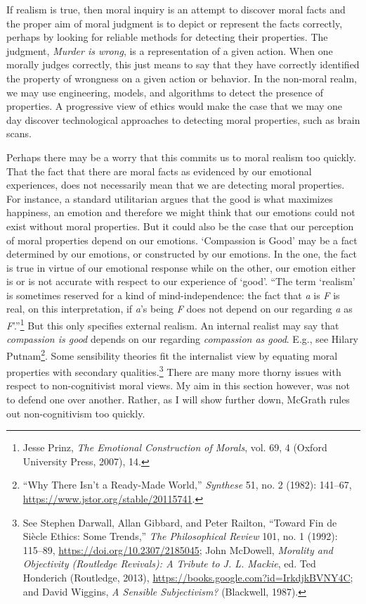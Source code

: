 \documentclass[phdthesis,12pt,final]{wuthesis}
\theoremstyle{definition}
\theoremstyle{definition}
\theoremstyle{definition}
\theoremstyle{definition}
\theoremstyle{remark}
\begin{document}
If realism is true, then moral inquiry is an attempt to discover moral facts and the proper aim of moral judgment is to depict or represent the facts correctly, perhaps by looking for reliable methods for detecting their properties. The judgment, \emph{Murder is wrong}, is a representation of a given action. When one morally judges correctly, this just means to say that they have correctly identified the property of wrongness on a given action or behavior. In the non-moral realm, we may use engineering, models, and algorithms to detect the presence of properties. A progressive view of ethics would make the case that we may one day discover technological approaches to detecting moral properties, such as brain scans.

Perhaps there may be a worry that this commits us to moral realism too quickly. That the fact that there are moral facts as evidenced by our emotional experiences, does not necessarily mean that we are detecting moral properties. For instance, a standard utilitarian argues that the good is what maximizes happiness, an emotion and therefore we might think that our emotions could not exist without moral properties. But it could also be the case that our perception of moral properties depend on our emotions. `Compassion is Good' may be a fact determined by our emotions, or constructed by our emotions. In the one, the fact is true in virtue of our emotional response while on the other, our emotion either is or is not accurate with respect to our experience of `good'. ``The term `realism' is sometimes reserved for a kind of mind-independence: the fact that \emph{a} is \emph{F} is real, on this interpretation, if \emph{a}'s being \emph{F} does not depend on our regarding \emph{a} as \emph{F}'.''\footnote{Jesse Prinz, \emph{The {Emotional Construction} of {Morals}}, vol. 69, 4 (Oxford University Press, 2007), 14.} But this only specifies external realism. An internal realist may say that \emph{compassion is good} depends on our regarding \emph{compassion as good}. E.g., see Hilary Putnam\footnote{{``Why {There Isn}'t a {Ready-Made World},''} \emph{Synthese} 51, no. 2 (1982): 141--67, \url{https://www.jstor.org/stable/20115741}.}. Some sensibility theories fit the internalist view by equating moral properties with secondary qualities.\footnote{See Stephen Darwall, Allan Gibbard, and Peter Railton, {``Toward Fin de Siècle Ethics: Some Trends,''} \emph{The Philosophical Review} 101, no. 1 (1992): 115--89, \url{https://doi.org/10.2307/2185045}; John McDowell, \emph{Morality and {Objectivity} ({Routledge Revivals}): {A Tribute} to {J}. {L}. {Mackie}}, ed. Ted Honderich (Routledge, 2013), \url{https://books.google.com?id=IrkdjkBVNY4C}; and David Wiggins, \emph{A {Sensible Subjectivism}?} (Blackwell, 1987).} There are many more thorny issues with respect to non-cognitivist moral views. My aim in this section however, was not to defend one over another. Rather, as I will show further down, McGrath rules out non-cognitivism too quickly.
\end{document}
